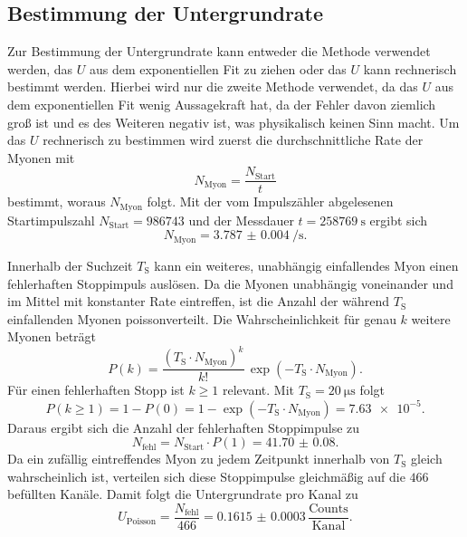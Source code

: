 \subsection{Bestimmung der Untergrundrate}
Zur Bestimmung der Untergrundrate kann entweder die Methode verwendet werden, das $U$ aus dem exponentiellen Fit zu ziehen oder das $U$ kann rechnerisch bestimmt werden. Hierbei wird nur die zweite Methode verwendet, da das $U$ aus dem exponentiellen Fit wenig Aussagekraft hat, da der Fehler davon ziemlich groß ist und es des Weiteren negativ ist, was physikalisch keinen Sinn macht.
Um das $U$ rechnerisch zu bestimmen wird zuerst die durchschnittliche Rate der Myonen mit
\begin{equation*}
    N_{\text{Myon}} = \frac{N_{\text{Start}}}{t}
\end{equation*}
bestimmt, woraus $N_{\text{Myon}} $ folgt.
Mit der vom Impulszähler abgelesenen Startimpulszahl $N_{\text{Start}} = \num{986743}$
und der Messdauer $t = \qty{258769}{\second}$ ergibt sich
\begin{equation*}
    N_{\text{Myon}} = \qty{3.787(4)}{\per\second} .
\end{equation*}

Innerhalb der Suchzeit $T_{\text{S}}$ kann ein weiteres, unabhängig einfallendes Myon einen
fehlerhaften Stoppimpuls auslösen. Da die Myonen unabhängig voneinander und im Mittel mit
konstanter Rate eintreffen, ist die Anzahl der während $T_{\text{S}}$ einfallenden Myonen
poissonverteilt. Die Wahrscheinlichkeit für genau $k$ weitere Myonen beträgt
\begin{equation*}
    P(k) = \frac{(T_{\text{S}} \cdot N_{\text{Myon}})^{k}}{k!} \,
           \exp(-T_{\text{S}} \cdot N_{\text{Myon}}) .
\end{equation*}
Für einen fehlerhaften Stopp ist $k \geq 1$ relevant. Mit $T_{\text{S}} = \qty{20}{\micro\second}$
folgt
\begin{equation*}
    P(k \geq 1) = 1 - P(0) = 1 - \exp(-T_{\text{S}} \cdot N_{\text{Myon}}) = \num{7.63e-5} .
\end{equation*}
Daraus ergibt sich die Anzahl der fehlerhaften Stoppimpulse zu
\begin{equation*}
    N_{\text{fehl}} = N_{\text{Start}} \cdot P(1) = \num{41.70(8)} .
\end{equation*}
Da ein zufällig eintreffendes Myon zu jedem Zeitpunkt innerhalb von $T_{\text{S}}$ gleich
wahrscheinlich ist, verteilen sich diese Stoppimpulse gleichmäßig auf die $\num{466}$
befüllten Kanäle. Damit folgt die Untergrundrate pro Kanal zu
\begin{equation*}
    U_{\text{Poisson}} = \frac{N_{\text{fehl}}}{466}
    = \num{0.1615(3)} \, \frac{\text{Counts}}{\text{Kanal}} .
\end{equation*}


\clearpage
